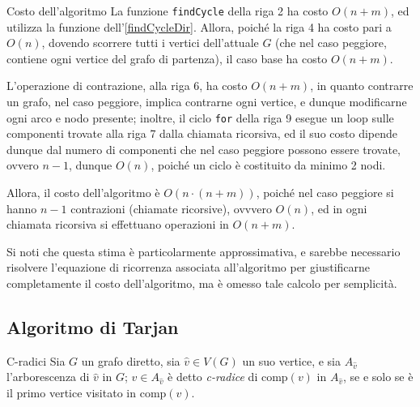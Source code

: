 \documentclass[a4paper, 12pt]{report}
\begin{document}
    \begin{framedobs}{Costo dell'algoritmo}
        La funzione \texttt{findCycle} della riga 2 ha costo $O(n + m)$, ed utilizza la funzione dell'\cref{findCycleDir}. Allora, poiché la riga 4 ha costo pari a $O(n)$, dovendo scorrere tutti i vertici dell'attuale $G$ (che nel caso peggiore, contiene ogni vertice del grafo di partenza), il caso base ha costo $O(n+ m)$.

        L'operazione di contrazione, alla riga 6, ha costo $O(n+m)$, in quanto contrarre un grafo, nel caso peggiore, implica contrarne ogni vertice, e dunque modificarne ogni arco e nodo presente; inoltre, il ciclo \texttt{for} della riga 9 esegue un loop sulle componenti trovate alla riga 7 dalla chiamata ricorsiva, ed il suo costo dipende dunque dal numero di componenti che nel caso peggiore possono essere trovate, ovvero $n - 1$, dunque $O(n)$, poiché un ciclo è costituito da minimo 2 nodi.

        Allora, il costo dell'algoritmo è $O(n \cdot (n + m))$, poiché nel caso peggiore si hanno $n - 1$ contrazioni (chiamate ricorsive), ovvvero $O(n)$, ed in ogni chiamata ricorsiva si effettuano operazioni in $O(n + m)$.

        Si noti che questa stima è particolarmente approssimativa, e sarebbe necessario risolvere l'equazione di ricorrenza associata all'algoritmo per giustificarne completamente il costo dell'algoritmo, ma è omesso tale calcolo per semplicità.
    \end{framedobs}

    \subsection{Algoritmo di Tarjan}

    \begin{frameddefn}{C-radici}
        Sia $G$ un grafo diretto, sia $\hat v \in V(G)$ un suo vertice, e sia $A_{\hat v}$ l'arborescenza di $\hat v$ in $G$; $v \in A_{\hat v}$ è detto \textit{c-radice} di $\mathrm{comp}(v)$ in $A_{\hat v}$, se e solo se è il primo vertice visitato in $\mathrm{comp}(v)$.
    \end{frameddefn}
\end{document}
